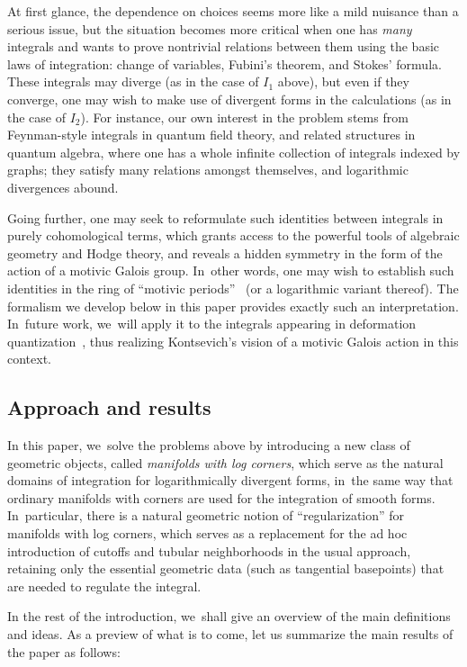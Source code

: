 \documentclass[JEP,XML,SOM,Unicode,NoFloatCountersInSection,published]{cedram}
\theoremstyle{definition}
\theoremstyle{remark}
\let\defn\emph
\begin{document}
At first glance, the dependence on choices seems more like a mild nuisance than a serious issue, but the situation becomes more critical when one has \emph{many} integrals and wants to prove nontrivial relations between them using the basic laws of integration: change of variables, Fubini's theorem, and Stokes' formula. These integrals may diverge (as in the case of $I_1$ above), but even if they converge, one may wish to make use of divergent forms in the calculations (as in the case of $I_2$). For instance, our own interest in the problem stems from Feynman-style integrals in quantum field theory, and related structures in quantum algebra, where one has a whole infinite collection of integrals indexed by graphs; they satisfy many relations amongst themselves, and logarithmic divergences abound.

Going further, one may seek to reformulate such identities between integrals in purely cohomological terms, which grants access to the powerful tools of algebraic geometry and Hodge theory, and reveals a hidden symmetry in the form of the action of a motivic Galois group. In~other words, one may wish to establish such identities in the ring of ``motivic periods''~\cite{KontsevichZagier,BrownMotivicPeriods} (or a logarithmic variant thereof). The formalism we develop below in this paper provides exactly such an interpretation. In~future work, we~will apply it to the integrals appearing in deformation quantization~\cite{KontsevichOperadsMotives,Kontsevich2003,AlekseevRossiTorossianWillwacher:Logs}, thus realizing Kontsevich's vision of a motivic Galois action in this context.

\subsection{Approach and results}\label{sec:results}
In this paper, we~solve the problems above by introducing a new class of geometric objects, called \defn{manifolds with log corners}, which serve as the natural domains of integration for logarithmically divergent forms, in~the same way that ordinary manifolds with corners are used for the integration of smooth forms. In~particular, there is a natural geometric notion of ``regularization'' for manifolds with log corners, which serves as a replacement for the ad hoc introduction of cutoffs and tubular neighborhoods in the usual approach, retaining only the essential geometric data (such as tangential basepoints) that are needed to regulate the integral.

In the rest of the introduction, we~shall give an overview of the main definitions and ideas. As a preview of what is to come, let us summarize the main results of the paper as follows:
\end{document}
